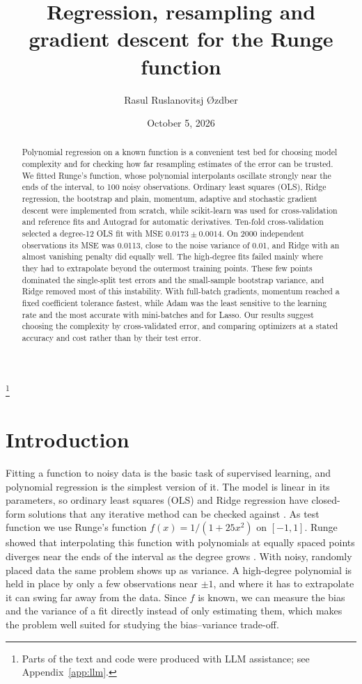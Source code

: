 \documentclass[aps,prb,reprint,superscriptaddress,nofootinbib,longbibliography,floatfix]{revtex4-2}
\begin{document}
\title{Regression, resampling and gradient descent for the Runge function}
\author{Rasul Ruslanovitsj {\O}zdber}
\thanks{Parts of the text and code were produced with LLM assistance; see Appendix~\protect\ref{app:llm}.}
\date{October 5, 2026}

\begin{abstract}
Polynomial regression on a known function is a convenient test bed for choosing model complexity and for checking how far resampling estimates of the error can be trusted. We fitted Runge's function, whose polynomial interpolants oscillate strongly near the ends of the interval, to 100 noisy observations. Ordinary least squares (OLS), Ridge regression, the bootstrap and plain, momentum, adaptive and stochastic gradient descent were implemented from scratch, while scikit-learn was used for cross-validation and reference fits and Autograd for automatic derivatives. Ten-fold cross-validation selected a degree-12 OLS fit with MSE $0.0173\pm0.0014$. On 2000 independent observations its MSE was 0.0113, close to the noise variance of 0.01, and Ridge with an almost vanishing penalty did equally well. The high-degree fits failed mainly where they had to extrapolate beyond the outermost training points. These few points dominated the single-split test errors and the small-sample bootstrap variance, and Ridge removed most of this instability. With full-batch gradients, momentum reached a fixed coefficient tolerance fastest, while Adam was the least sensitive to the learning rate and the most accurate with mini-batches and for Lasso. Our results suggest choosing the complexity by cross-validated error, and comparing optimizers at a stated accuracy and cost rather than by their test error.
\end{abstract}
\maketitle

\section{Introduction}\label{sec:intro}
Fitting a function to noisy data is the basic task of supervised learning, and polynomial regression is the simplest version of it. The model is linear in its parameters, so ordinary least squares (OLS) and Ridge regression have closed-form solutions that any iterative method can be checked against \cite{HjorthJensen2026,Hastie2009}. As test function we use Runge's function $f(x)=1/(1+25x^2)$ on $[-1,1]$. Runge showed that interpolating this function with polynomials at equally spaced points diverges near the ends of the interval as the degree grows \cite{Runge1901}. With noisy, randomly placed data the same problem shows up as variance. A high-degree polynomial is held in place by only a few observations near $\pm1$, and where it has to extrapolate it can swing far away from the data. Since $f$ is known, we can measure the bias and the variance of a fit directly instead of only estimating them, which makes the problem well suited for studying the bias--variance trade-off.
\end{document}
